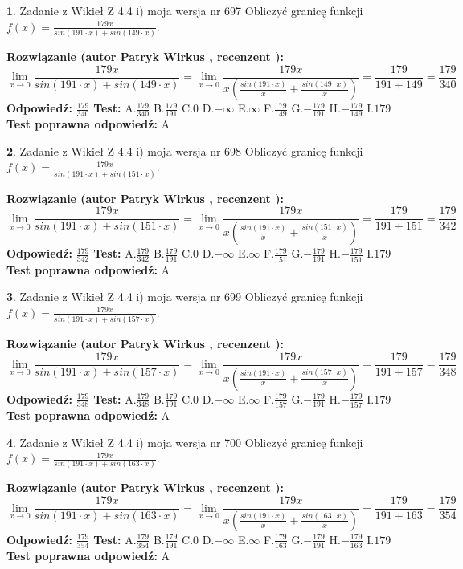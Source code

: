 \documentclass[12pt, a4paper]{article}
\theoremstyle{definition} %
\newtheorem{zad}{}
\newcommand{\zadStart}[1]{\begin{zad}#1\newline}
\newcommand{\zadStop}{\end{zad}}
\newcommand{\rozwStart}[2]{\noindent \textbf{Rozwiązanie (autor #1 , recenzent #2): }\newline}
\newcommand{\rozwStop}{\newline}
\newcommand{\odpStart}{\noindent \textbf{Odpowiedź:}\newline}
\newcommand{\odpStop}{\newline}
\newcommand{\testStart}{\noindent \textbf{Test:}\newline}
\newcommand{\testStop}{\newline}
\newcommand{\kluczStart}{\noindent \textbf{Test poprawna odpowiedź:}\newline}
\newcommand{\kluczStop}{\newline}
\begin{document}
\zadStart{Zadanie z Wikieł Z 4.4 i) moja wersja nr 697}
Obliczyć granicę funkcji $f(x)=\frac{179x}{sin(191\cdot x) +sin(149\cdot x)}$.
\zadStop
\rozwStart{Patryk Wirkus}{}
$$\lim\limits_{x\to 0}\frac{179x}{sin(191\cdot x) +sin(149\cdot x)}=\lim\limits_{x\to 0}\frac{179x}{x(\frac{sin(191\cdot x)}{x}+\frac{sin(149\cdot x)}{x})}=\frac{179}{191+149} = \frac{179}{340}$$
\rozwStop
\odpStart
$\frac{179}{340}$
\odpStop
\testStart
A.$\frac{179}{340}$
B.$\frac{179}{191}$
C.$0$
D.$-\infty$
E.$\infty$
F.$\frac{179}{149}$
G.$-\frac{179}{191}$
H.$-\frac{179}{149}$
I.$179$
\testStop
\kluczStart
A
\kluczStop



\zadStart{Zadanie z Wikieł Z 4.4 i) moja wersja nr 698}
Obliczyć granicę funkcji $f(x)=\frac{179x}{sin(191\cdot x) +sin(151\cdot x)}$.
\zadStop
\rozwStart{Patryk Wirkus}{}
$$\lim\limits_{x\to 0}\frac{179x}{sin(191\cdot x) +sin(151\cdot x)}=\lim\limits_{x\to 0}\frac{179x}{x(\frac{sin(191\cdot x)}{x}+\frac{sin(151\cdot x)}{x})}=\frac{179}{191+151} = \frac{179}{342}$$
\rozwStop
\odpStart
$\frac{179}{342}$
\odpStop
\testStart
A.$\frac{179}{342}$
B.$\frac{179}{191}$
C.$0$
D.$-\infty$
E.$\infty$
F.$\frac{179}{151}$
G.$-\frac{179}{191}$
H.$-\frac{179}{151}$
I.$179$
\testStop
\kluczStart
A
\kluczStop



\zadStart{Zadanie z Wikieł Z 4.4 i) moja wersja nr 699}
Obliczyć granicę funkcji $f(x)=\frac{179x}{sin(191\cdot x) +sin(157\cdot x)}$.
\zadStop
\rozwStart{Patryk Wirkus}{}
$$\lim\limits_{x\to 0}\frac{179x}{sin(191\cdot x) +sin(157\cdot x)}=\lim\limits_{x\to 0}\frac{179x}{x(\frac{sin(191\cdot x)}{x}+\frac{sin(157\cdot x)}{x})}=\frac{179}{191+157} = \frac{179}{348}$$
\rozwStop
\odpStart
$\frac{179}{348}$
\odpStop
\testStart
A.$\frac{179}{348}$
B.$\frac{179}{191}$
C.$0$
D.$-\infty$
E.$\infty$
F.$\frac{179}{157}$
G.$-\frac{179}{191}$
H.$-\frac{179}{157}$
I.$179$
\testStop
\kluczStart
A
\kluczStop



\zadStart{Zadanie z Wikieł Z 4.4 i) moja wersja nr 700}
Obliczyć granicę funkcji $f(x)=\frac{179x}{sin(191\cdot x) +sin(163\cdot x)}$.
\zadStop
\rozwStart{Patryk Wirkus}{}
$$\lim\limits_{x\to 0}\frac{179x}{sin(191\cdot x) +sin(163\cdot x)}=\lim\limits_{x\to 0}\frac{179x}{x(\frac{sin(191\cdot x)}{x}+\frac{sin(163\cdot x)}{x})}=\frac{179}{191+163} = \frac{179}{354}$$
\rozwStop
\odpStart
$\frac{179}{354}$
\odpStop
\testStart
A.$\frac{179}{354}$
B.$\frac{179}{191}$
C.$0$
D.$-\infty$
E.$\infty$
F.$\frac{179}{163}$
G.$-\frac{179}{191}$
H.$-\frac{179}{163}$
I.$179$
\testStop
\kluczStart
A
\kluczStop
\end{document}
